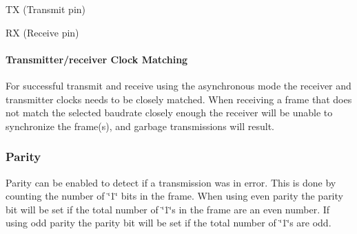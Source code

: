 \begin{DoxyItemize}
\item T\+X (Transmit pin)
\item R\+X (Receive pin)
\end{DoxyItemize}\hypertarget{group__asfdoc__sam0__sercom__usart__group_asfdoc_sam0_sercom_usart_overview_async_clock_matching}{}\paragraph{Transmitter/receiver Clock Matching}\label{group__asfdoc__sam0__sercom__usart__group_asfdoc_sam0_sercom_usart_overview_async_clock_matching}
For successful transmit and receive using the asynchronous mode the receiver and transmitter clocks needs to be closely matched. When receiving a frame that does not match the selected baudrate closely enough the receiver will be unable to synchronize the frame(s), and garbage transmissions will result.\hypertarget{group__asfdoc__sam0__sercom__usart__group_asfdoc_sam0_sercom_usart_parity}{}\subsubsection{Parity}\label{group__asfdoc__sam0__sercom__usart__group_asfdoc_sam0_sercom_usart_parity}
Parity can be enabled to detect if a transmission was in error. This is done by counting the number of \char`\"{}1\char`\"{} bits in the frame. When using even parity the parity bit will be set if the total number of \char`\"{}1\char`\"{}s in the frame are an even number. If using odd parity the parity bit will be set if the total number of \char`\"{}1\char`\"{}s are odd.

